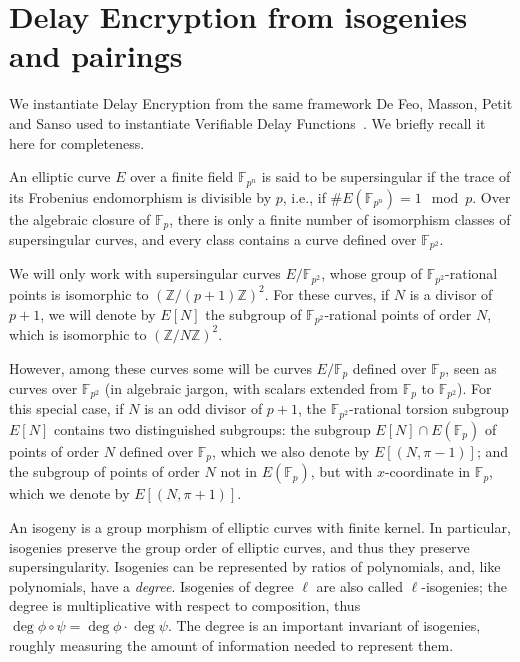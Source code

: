 \documentclass{llncs}
\newcommand{\Z}{\mathbb{Z}}
\newcommand{\F}{\mathbb{F}}
\begin{document}
\section{Delay Encryption from isogenies and pairings}
\label{sec:delay-encrypt-from}

We instantiate Delay Encryption from the same framework De Feo,
Masson, Petit and Sanso used to instantiate Verifiable Delay
Functions~\cite{10.1007/978-3-030-34578-5_10}. %
We briefly recall it here for completeness.

An elliptic curve $E$ over a finite field $\F_{p^n}$ is said to be
supersingular if the trace of its Frobenius endomorphism is divisible
by $p$, i.e., if $\#E(\F_{p^n})=1\mod p$. %
Over the algebraic closure of $\F_p$, there is only a finite number of
isomorphism classes of supersingular curves, and every class contains
a curve defined over $\F_{p^2}$. %

We will only work with supersingular curves $E/\F_{p^2}$, whose group
of $\F_{p^2}$-rational points is isomorphic to ${(\Z/(p+1)\Z)}^2$. %
For these curves, if $N$ is a divisor of $p+1$, we will denote by
$E[N]$ the subgroup of $\F_{p^2}$-rational points of order $N$, which
is isomorphic to ${(\Z/N\Z)}^2$.

However, among these curves some will be curves $E/\F_p$ defined over
$\F_p$, seen as curves over $\F_{p^2}$ (in algebraic jargon, with
scalars extended from $\F_p$ to $\F_{p^2}$). %
For this special case, if $N$ is an odd divisor of $p+1$, the
$\F_{p^2}$-rational torsion subgroup $E[N]$ contains two distinguished
subgroups: the subgroup $E[N]\cap E(\F_p)$ of points of order $N$
defined over $\F_p$, which we also denote by $E[(N,\pi-1)]$; and the
subgroup of points of order $N$ not in $E(\F_p)$, but with
$x$-coordinate in $\F_p$, which we denote by $E[(N,\pi+1)]$.

An isogeny is a group morphism of elliptic curves with finite
kernel. %
In particular, isogenies preserve the group order of elliptic curves,
and thus they preserve supersingularity. %
Isogenies can be represented by ratios of polynomials, and, like
polynomials, have a \emph{degree}. %
Isogenies of degree $\ell$ are also called $\ell$-isogenies; the
degree is multiplicative with respect to composition, thus
$\deg\phi\circ\psi=\deg\phi\cdot\deg\psi$. %
The degree is an important invariant of isogenies, roughly measuring
the amount of information needed to represent them.
\end{document}
